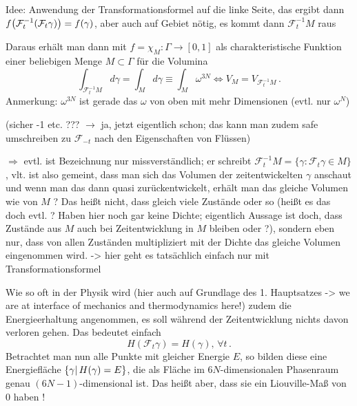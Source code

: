 \documentclass[../class_mech_main.tex]{subfiles}
\begin{document}
Idee: Anwendung der Transformationsformel auf die linke Seite, das ergibt dann $f\qty(\mathcal{F}_t^{-1}(\mathcal{F}_t \gamma)) = f(\gamma)$, aber auch auf Gebiet nötig, es kommt dann $\mathcal{F}_t^{-1}M$ raus


Daraus erhält man dann mit $f = \chi_M: \Gamma \rightarrow [0,1]$ als charakteristische Funktion einer beliebigen Menge $M \subset \Gamma$ für die Volumina
\begin{equation}
\int_{\mathcal{F}_t^{-1} M} d\gamma = \int_M d\gamma  \equiv \int_M \omega^{3N} \Leftrightarrow V_M = V_{\mathcal{F}_t^{-1}M} \, .
\end{equation}
Anmerkung: $\omega^{3N}$ ist gerade das $\omega$ von oben mit mehr Dimensionen (evtl. nur $\omega^N$)

(sicher -1 etc. ??? $\rightarrow$ ja, jetzt eigentlich schon; das kann man zudem safe umschreiben zu $\mathcal{F}_{-t}$ nach den Eigenschaften von Flüssen)

$\Rightarrow$ evtl. ist Bezeichnung nur missverständlich; er schreibt $\mathcal{F}_t^{-1}M = \{\gamma: \mathcal{F}_t \gamma \in M\}$, vlt. ist also gemeint, dass man sich das Volumen der zeitentwickelten $\gamma$ anschaut und wenn man das dann quasi zurückentwickelt, erhält man das gleiche Volumen wie von $M$ ? Das heißt nicht, dass gleich viele Zustände oder so (heißt es das doch evtl. ? Haben hier noch gar keine Dichte; eigentlich Aussage ist doch, dass Zustände aus $M$ auch bei Zeitentwicklung in $M$ bleiben oder ?), sondern eben nur, dass von allen Zuständen multipliziert mit der Dichte das gleiche Volumen eingenommen wird.
-> hier geht es tatsächlich einfach nur mit Transformationsformel

Wie so oft in der Physik wird (hier auch auf Grundlage des 1. Hauptsatzes -> we are at interface of mechanics and thermodynamics here!) zudem die Energieerhaltung angenommen, es soll während der Zeitentwicklung nichts davon verloren gehen. Das bedeutet einfach
\begin{equation}
H(\mathcal{F}_t \gamma) = H(\gamma), \, \forall t \, .
\end{equation}
Betrachtet man nun alle Punkte mit gleicher Energie $E$, so bilden diese eine Energiefläche $\qty{\gamma | \, H(\gamma) = E}$, die als Fläche im $6N$-dimensionalen Phasenraum genau $(6N-1)$-dimensional ist. Das heißt aber, dass sie ein Liouville-Maß von 0 haben !
\end{document}
